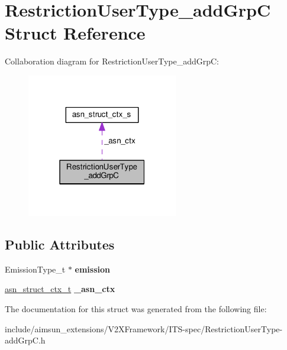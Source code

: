 \hypertarget{structRestrictionUserType__addGrpC}{}\section{Restriction\+User\+Type\+\_\+add\+GrpC Struct Reference}
\label{structRestrictionUserType__addGrpC}


Collaboration diagram for Restriction\+User\+Type\+\_\+add\+GrpC\+:\nopagebreak
\begin{figure}[H]
\begin{center}
\leavevmode
\includegraphics[width=187pt]{structRestrictionUserType__addGrpC__coll__graph}
\end{center}
\end{figure}
\subsection*{Public Attributes}
\begin{DoxyCompactItemize}
\item 
Emission\+Type\+\_\+t $\ast$ {\bfseries emission}\hypertarget{structRestrictionUserType__addGrpC_acefefff20608596c5e4f025e8091520f}{}\label{structRestrictionUserType__addGrpC_acefefff20608596c5e4f025e8091520f}

\item 
\hyperlink{structasn__struct__ctx__s}{asn\+\_\+struct\+\_\+ctx\+\_\+t} {\bfseries \+\_\+asn\+\_\+ctx}\hypertarget{structRestrictionUserType__addGrpC_a1552d9fbf72b3c109314e89b1238e890}{}\label{structRestrictionUserType__addGrpC_a1552d9fbf72b3c109314e89b1238e890}

\end{DoxyCompactItemize}


The documentation for this struct was generated from the following file\+:\begin{DoxyCompactItemize}
\item 
include/aimsun\+\_\+extensions/\+V2\+X\+Framework/\+I\+T\+S-\/spec/Restriction\+User\+Type-\/add\+Grp\+C.\+h\end{DoxyCompactItemize}
